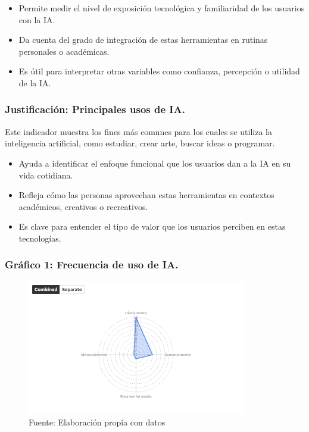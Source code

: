 \documentclass[12pt, a4paper]{article}
\begin{document}
\begin{itemize}
    \item Permite medir el nivel de exposición tecnológica y familiaridad de los usuarios con la IA.
    \item Da cuenta del grado de integración de estas herramientas en rutinas personales o académicas.
    \item Es útil para interpretar otras variables como confianza, percepción o utilidad de la IA.
\end{itemize}

\subsubsection*{Justificación: Principales usos de IA.}
Este indicador muestra los fines más comunes para los cuales se utiliza la inteligencia artificial, como estudiar, crear arte, buscar ideas o programar.

\begin{itemize}
    \item Ayuda a identificar el enfoque funcional que los usuarios dan a la IA en su vida cotidiana.
    \item Refleja cómo las personas aprovechan estas herramientas en contextos académicos, creativos o recreativos.
    \item Es clave para entender el tipo de valor que los usuarios perciben en estas tecnologías.
\end{itemize}


\subsubsection*{Gráfico 1: Frecuencia de uso de IA.}
\begin{figure}[H]
    \centering
    \includegraphics[width=0.85\textwidth]{Graficos/Radar_frec_ia_FC.png}
    \caption[1]{Fuente: Elaboración propia con datos}
\end{figure}
\end{document}

